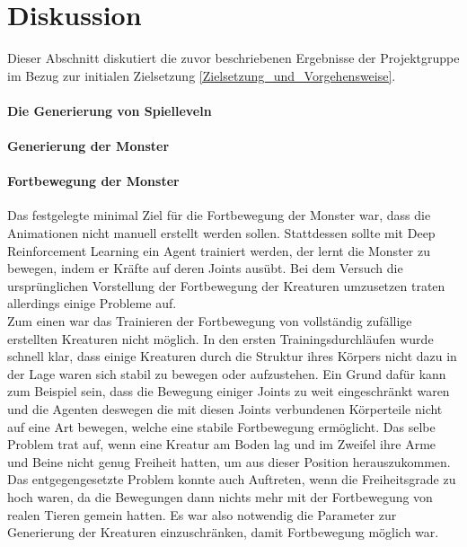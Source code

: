 \section{Diskussion}
\label{Diskussion}

Dieser Abschnitt diskutiert die zuvor beschriebenen Ergebnisse der Projektgruppe im Bezug zur initialen Zielsetzung \ref{Zielsetzung_und_Vorgehensweise}.

\paragraph{Die Generierung von Spielleveln}

\paragraph{Generierung der Monster}

\paragraph{Fortbewegung der Monster} \fup

Das festgelegte minimal Ziel für die Fortbewegung der Monster war, dass die Animationen nicht manuell erstellt werden sollen. 
Stattdessen sollte mit Deep Reinforcement Learning ein Agent trainiert werden, der lernt die Monster zu bewegen, indem er Kräfte auf deren Joints ausübt.
Bei dem Versuch die ursprünglichen Vorstellung der Fortbewegung der Kreaturen umzusetzen traten allerdings einige Probleme auf.\\

Zum einen war das Trainieren der Fortbewegung von vollständig zufällige erstellten Kreaturen nicht möglich. 
In den ersten Trainingsdurchläufen wurde schnell klar, dass einige Kreaturen durch die Struktur ihres Körpers nicht dazu in der Lage waren sich stabil zu bewegen oder aufzustehen.
Ein Grund dafür kann zum Beispiel sein, dass die Bewegung einiger Joints zu weit eingeschränkt waren und die Agenten deswegen die mit diesen Joints verbundenen Körperteile nicht auf eine Art bewegen, welche eine stabile Fortbewegung ermöglicht. Das selbe Problem trat auf, wenn eine Kreatur am Boden lag und im Zweifel ihre Arme und Beine nicht genug Freiheit hatten, um aus dieser Position herauszukommen.
Das entgegengesetzte Problem konnte auch Auftreten, wenn die Freiheitsgrade zu hoch waren, da die Bewegungen dann nichts mehr mit der Fortbewegung von realen Tieren gemein hatten. Es war also notwendig die Parameter zur Generierung der Kreaturen einzuschränken, damit Fortbewegung möglich war.\\

